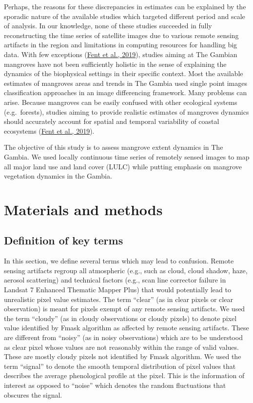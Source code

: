 \documentclass[utf8]{frontiersSCNS}
\begin{document}
Perhaps, the reasons for these discrepancies in estimates can be
explained by the sporadic nature of the available studies which targeted
different period and scale of analysis. In our knowledge, none of these
studies succeeded in fully reconstructing the time series of satellite
images due to various remote sensing artifacts in the region and
limitations in computing resources for handling big data. With few
exceptions (\protect\hyperlink{ref-Fent-et-al-2019}{Fent et al., 2019}),
studies aiming at The Gambian mangroves have not been sufficiently
holistic in the sense of explaining the dynamics of the biophysical
settings in their specific context. Most the available estimates of
mangroves areas and trends in The Gambia used single point images
classification approaches in an image differencing framework. Many
problems can arise. Because mangroves can be easily confused with other
ecological systems (e.g.~forests), studies aiming to provide realistic
estimates of mangroves dynamics should accurately account for spatial
and temporal variability of coastal ecosystems
(\protect\hyperlink{ref-Fent-et-al-2019}{Fent et al., 2019}).

The objective of this study is to assess mangrove extent dynamics in The
Gambia. We used locally continuous time series of remotely sensed images
to map all major land use and land cover (LULC) while putting emphasis
on mangrove vegetation dynamics in the Gambia.

\hypertarget{materials-and-methods}{%
\section*{Materials and methods}\label{materials-and-methods}}

\hypertarget{ref22}{%
\subsection{Definition of key terms}\label{ref22}}

In this section, we define several terms which may lead to confusion.
Remote sensing artifacts regroup all atmospheric (e.g., such as cloud,
cloud shadow, haze, aerosol scattering) and technical factors (e.g.,
scan line corrector failure in Landsat 7 Enhanced Thematic Mapper Plus)
that would potentially lead to unrealistic pixel value estimates. The
term ``clear'' (as in clear pixels or clear observation) is meant for
pixels exempt of any remote sensing artifacts. We used the term
``cloudy'' (as in cloudy observations or cloudy pixels) to denote pixel
value identified by Fmask algorithm as affected by remote sensing
artifacts. These are different from ``noisy'' (as in noisy observations)
which are to be understood as clear pixel whose values are not
reasonably within the range of valid values. These are mostly cloudy
pixels not identified by Fmask algorithm. We used the term ``signal'' to
denote the smooth temporal distribution of pixel values that describes
the average phenological profile at the pixel. This is the information
of interest as opposed to ``noise'' which denotes the random
fluctuations that obscures the signal.
\end{document}

